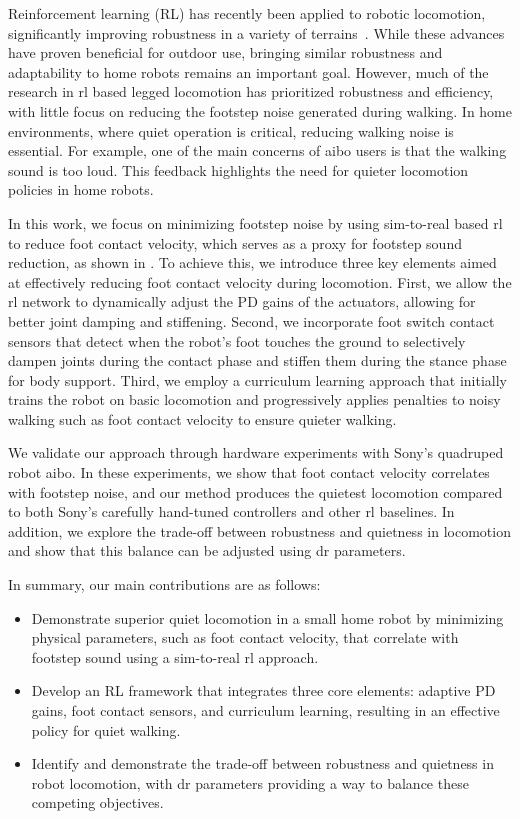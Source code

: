 Reinforcement learning (RL) has recently been applied to robotic locomotion, significantly improving robustness in a variety of terrains~\cite{anymal_terrain, anymal_perceptive, Choi2023-cf, Wu2023-nz, anymal_dtc, legged_gym}. While these advances have proven beneficial for outdoor use, bringing similar robustness and adaptability to home robots remains an important goal. However, much of the research in \ac{rl} based legged locomotion has prioritized robustness and efficiency, with little focus on reducing the footstep noise generated during walking.
In home environments, where quiet operation is critical, reducing walking noise is essential. For example, one of the main concerns of aibo users is that the walking sound is too loud. This feedback highlights the need for quieter locomotion policies in home robots.

In this work, we focus on minimizing footstep noise by using sim-to-real based \ac{rl} to reduce foot contact velocity, which serves as a proxy for footstep sound reduction, as shown in . To achieve this, we introduce three key elements aimed at effectively reducing foot contact velocity during locomotion. First, we allow the \ac{rl} network to dynamically adjust the PD gains of the actuators, allowing for better joint damping and stiffening. Second, we incorporate foot switch contact sensors that detect when the robot's foot touches the ground to selectively dampen joints during the contact phase and stiffen them during the stance phase for body support. Third, we employ a curriculum learning approach that initially trains the robot on basic locomotion and progressively applies penalties to noisy walking such as foot contact velocity to ensure quieter walking.

We validate our approach through hardware experiments with Sony's quadruped robot aibo. In these experiments, we show that foot contact velocity correlates with footstep noise, and our method produces the quietest locomotion compared to both Sony's carefully hand-tuned controllers and other \ac{rl} baselines. In addition, we explore the trade-off between robustness and quietness in locomotion and show that this balance can be adjusted using \ac{dr} parameters.

In summary, our main contributions are as follows: 
\begin{itemize} 
\item Demonstrate superior quiet locomotion in a small home robot by minimizing physical parameters, such as foot contact velocity, that correlate with footstep sound using a sim-to-real \ac{rl} approach. 
\item Develop an RL framework that integrates three core elements: adaptive PD gains, foot contact sensors, and curriculum learning, resulting in an effective policy for quiet walking. 
\item Identify and demonstrate the trade-off between robustness and quietness in robot locomotion, with \ac{dr} parameters providing a way to balance these competing objectives. 
\end{itemize}

